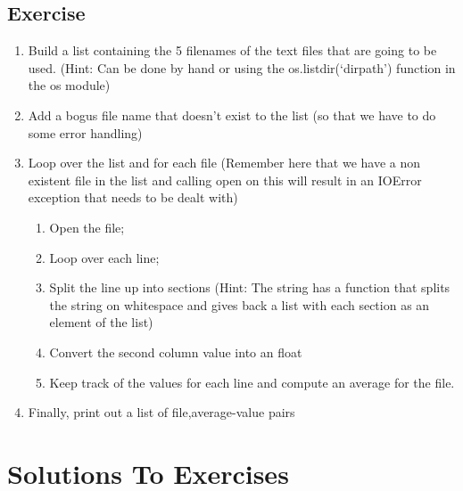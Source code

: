 \documentclass[letterpaper,10pt,english,openany]{sphinxmanual}
\begin{document}
\subsection{Exercise}
\label{\detokenize{introduction_to_python/basic_python_exercises_5:exercise}}\begin{enumerate}
\def\theenumi{\arabic{enumi}}
\def\labelenumi{\theenumi .}
\makeatletter\def\p@enumii{\p@enumi \theenumi .}\makeatother
\item {} 
Build a list containing the 5 filenames of the text files that are
going to be used. (Hint: Can be done by hand or using the
os.listdir(‘dirpath’) function in the os module)

\item {} 
Add a bogus file name that doesn’t exist to the list (so that we have
to do some error handling)

\item {} 
Loop over the list and for each file (Remember here that we have a
non existent file in the list and calling open on this will result in
an IOError exception that needs to be dealt with)
\begin{enumerate}
\def\theenumii{\arabic{enumii}}
\def\labelenumii{\theenumii .}
\makeatletter\def\p@enumiii{\p@enumii \theenumii .}\makeatother
\item {} 
Open the file;

\item {} 
Loop over each line;

\item {} 
Split the line up into sections (Hint: The string has a
 function that splits the string on whitespace and
gives back a list with each section as an element of the list)

\item {} 
Convert the second column value into an float

\item {} 
Keep track of the values for each line and compute an average for
the file.

\end{enumerate}

\item {} 
Finally, print out a list of file,average-value pairs

\end{enumerate}


\section{Solutions To Exercises}
\label{\detokenize{introduction_to_python/solutions_to_exercises:solutions-to-exercises}}\label{\detokenize{introduction_to_python/solutions_to_exercises:id1}}\label{\detokenize{introduction_to_python/solutions_to_exercises::doc}}
\end{document}
